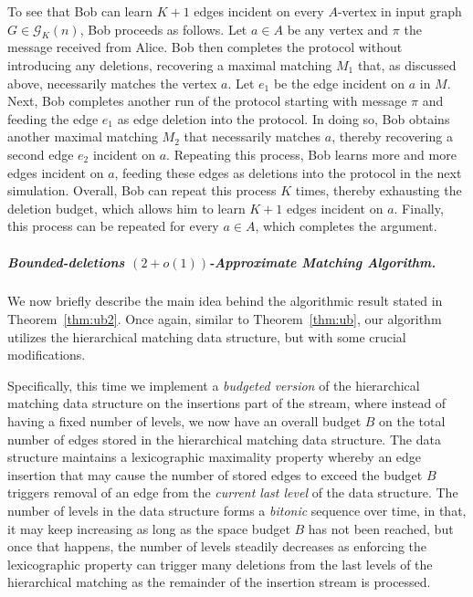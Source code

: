 \documentclass[11pt,a4paper]{article}
\begin{document}
To see that Bob can learn $K+1$ edges incident on every $A$-vertex in input graph $G \in \mathcal{G}_K(n)$, Bob proceeds as follows. Let $a \in A$ be any vertex and $\pi$ the message received from Alice. Bob then completes the protocol without introducing any deletions, recovering a maximal matching $M_1$ that, as discussed above, necessarily matches the vertex $a$. Let $e_1$ be the edge incident on $a$ in $M$. Next, Bob completes another run of the protocol starting with message $\pi$ and feeding the edge $e_1$ as edge deletion into the protocol. In doing so, Bob obtains another maximal matching $M_2$ that necessarily matches $a$, thereby recovering a second edge $e_2$ incident on $a$. Repeating this process, Bob learns more and more edges incident on $a$, feeding these edges as deletions into the protocol in the next simulation. Overall, Bob can repeat this process $K$ times, thereby exhausting the deletion budget, which allows him to learn $K+1$ edges incident on $a$. Finally, this process can be repeated for every $a \in A$, which completes the argument.


\subparagraph{Bounded-deletions $(2+o(1))$-Approximate Matching Algorithm.}
We now briefly describe the main idea behind the algorithmic result stated in Theorem~\ref{thm:ub2}. Once again, similar to Theorem~\ref{thm:ub}, our algorithm utilizes the hierarchical matching data structure, but with some crucial modifications.

Specifically, this time we implement a {\em budgeted version} of the hierarchical matching data structure on the insertions part of the stream, where instead of having a fixed number of levels, we now have an overall budget $B$ on the total number of edges stored in the hierarchical matching data structure. The data structure maintains a lexicographic maximality property whereby an edge insertion that may cause the number of stored edges to exceed the budget $B$ triggers removal of an edge from the {\em current last level} of the data structure. The number of levels in the data structure forms a {\em bitonic} sequence over time, in that, it may keep increasing as long as the space budget $B$ has not been reached, but once that happens, the number of levels steadily decreases as enforcing the lexicographic property can trigger many 
deletions from the last levels of the hierarchical matching as the remainder of the insertion stream is processed.
 
\end{document}
